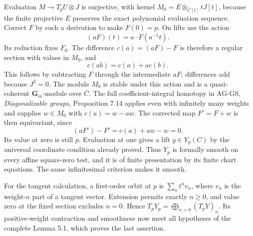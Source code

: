 \documentclass[11pt,a4paper,openany]{report}
\begin{document}
Evaluation \(M\to T_pU\otimes J\) is surjective, with kernel \(M_0=E\otimes_{\bar C[t]}tJ[t]\), because the finite projective \(E\) preserves the exact polynomial evaluation sequence. Correct \(F\) by such a derivation to make \(F(0)=p\). On lifts use the action \[
                       (aF)(t)=a\cdot F(a^{-1}t).
\] Its reduction fixes \(F_0\). The difference \(c(a)=(aF)-F\) is therefore a regular section with values in \(M_0\), and \[
                        c(ab)=c(a)+a c(b).
\] This follows by subtracting \(F\) through the intermediate \(aF\); differences add because \(J^2=0\). The module \(M_0\) is stable under this action and is a quasi-coherent \(\mathbf G_m\)-module over \(\bar C\). The full coefficient-integral homotopy in AG-GS, \emph{Diagonalizable groups}, Proposition 7.14 applies even with infinitely many weights and supplies \(w\in M_0\) with \(c(a)=w-aw\). The corrected map \(F'=F+w\) is then equivariant, since \[
                       (aF')-F'=c(a)+aw-w=0.
\] Its value at zero is still \(p\). Evaluation at one gives a lift \(y\in Y_p(C)\) by the universal coordinate condition already proved. Thus \(Y_p\) is formally smooth on every affine square-zero test, and it is of finite presentation by its finite chart equations. The same infinitesimal criterion makes it smooth.

For the tangent calculation, a first-order orbit at \(p\) is \(\sum_n t^n v_n\), where \(v_n\) is the weight-\(n\) part of a tangent vector. Extension permits exactly \(n\ge0\), and value zero at the fixed section excludes \(n=0\). Hence \(T_pY_p=\bigoplus_{n>0}(T_pY)_n\). Its positive-weight contraction and smoothness now meet all hypotheses of the complete Lemma 5.1, which proves the last assertion.
\end{document}

